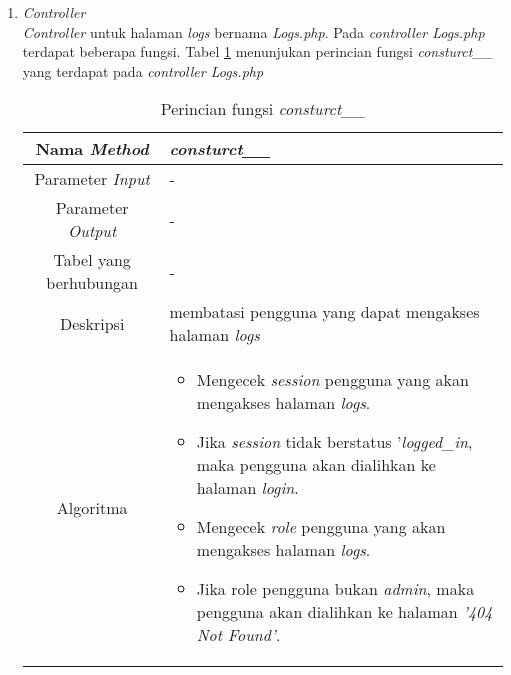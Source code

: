 \begin{enumerate}
	\item \textit{Controller} \\
	\textit{Controller} untuk halaman \textit{logs} bernama \textit{Logs.php}. Pada \textit{controller Logs.php} terdapat beberapa fungsi. Tabel \ref{tab:f3logs} menunjukan perincian fungsi \textit{consturct\_\_} yang terdapat pada \textit{controller Logs.php}
	\begin{table}[H]
		\caption{Perincian fungsi \textit{consturct\_\_}}
		\label{tab:f3logs}
		\begin{tabular}{|c|p{11cm}|}
			\hline
			Nama \textit{Method} 	& 	\textit{consturct\_\_} 	\\
			\hline
			Parameter \textit{Input} & - \\
			\hline
			Parameter \textit{Output} &  - \\
			\hline
			Tabel yang berhubungan & - \\
			\hline
			Deskripsi	& membatasi pengguna yang dapat mengakses halaman \textit{logs}	 \\
			\hline
			Algoritma	& \begin{itemize}
				\item Mengecek \textit{session} pengguna yang akan mengakses halaman \textit{logs}.
				\item Jika \textit{session} tidak berstatus '\textit{logged\_in}, maka pengguna akan dialihkan ke halaman \textit{login}.
				\item Mengecek \textit{role} pengguna yang akan mengakses halaman \textit{logs}.
				\item Jika role pengguna bukan \textit{admin}, maka pengguna akan dialihkan ke halaman \textit{'404 Not Found'}.
			\end{itemize} \\
			\hline
		\end{tabular}
	\end{table}


\end{enumerate}
